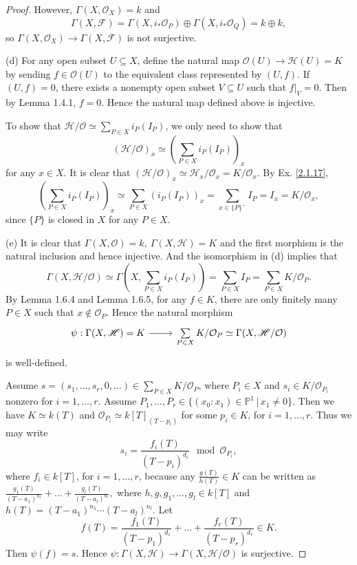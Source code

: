\documentclass{amsart}
\theoremstyle{remark}\newtheorem{rmk}[theorem]{Remark}
\begin{document}
\begin{proof}
	However, $\Gamma(X,\mathcal{O}_X)=k$ and $$\Gamma(X,\mathscr{F})=\Gamma(X,i_*\mathcal{O}_P)\oplus\Gamma(X,i_*\mathcal{O}_Q)=k\oplus k,$$ so $\Gamma(X,\mathcal{O}_X)\to\Gamma(X,\mathscr{F})$ is not surjective.
	
	(d) For any open subset $U\subseteq X$, define the natural map $\mathcal{O}(U)\to\mathscr{H}(U)=K$ by sending $f\in\mathcal{O}(U)$ to the equivalent class represented by $(U,f)$. If $(U,f)=0$, there exists a nonempty open subset $V\subseteq U$ such that $f|_V=0$. Then by Lemma 1.4.1, $f=0$. Hence the natural map defined above is injective.
	
	To show that $\mathscr{H}/\mathcal{O}\simeq\sum_{P\in X}i_P(I_P)$, we only need to show that $$(\mathscr{H}/\mathcal{O})_x\simeq\left(\sum_{P\in X}i_P(I_P)\right)_x$$ for any $x\in X$. It is clear that $(\mathscr{H}/\mathcal{O})_x\simeq\mathscr{H}_x/\mathcal{O}_x=K/\mathcal{O}_x$. By Ex. \ref{2.1.17}, $$\left(\sum_{P\in X}i_P(I_P)\right)_x\simeq\sum_{P\in X}(i_P(I_P))_x=\sum_{x\in\{P\}^-}I_P=I_x=K/\mathcal{O}_x,$$ since $\{P\}$ is closed in $X$ for any $P\in X$.
	
	(e) It is clear that $\Gamma(X,\mathcal{O})=k,\ \Gamma(X,\mathscr{H})=K$ and the first morphism is the natural inclusion and hence injective. And the isomorphism in (d) implies that $$\Gamma(X,\mathscr{H}/\mathcal{O})\simeq\Gamma\left(X,\sum_{P\in X}i_P(I_P)\right)=\sum_{P\in X}I_P=\sum_{P\in X}K/\mathcal{O}_P.$$ By Lemma 1.6.4 and Lemma 1.6.5, for any $f\in K$, there are only finitely many $P\in X$ such that $x\notin\mathcal{O}_P$. Hence the natural morphism 
	\begin{equation*}
		\begin{tikzcd}
			{\psi:\Gamma(X,\mathscr{H})=K} \arrow[r] & {\sum\limits_{P\in X}K/\mathcal{O}_P\simeq\Gamma(X,\mathscr{H}/\mathcal{O})}
		\end{tikzcd}
	\end{equation*}
	is well-defined.
	
	Assume $s=(s_1,\dots,s_r,0,\dots)\in\sum_{P\in X}K/\mathcal{O}_P$, where $P_i\in X$ and $s_i\in K/\mathcal{O}_{P_i}$ nonzero for $i=1,\dots,r$. Assume $P_1,\dots,P_r\in\{(x_0:x_1)\in\mathbb{P}^1\,|\,x_1\neq0\}$. Then we have $K\simeq k(T)$ and $\mathcal{O}_{P_i}\simeq k[T]_{(T-p_i)}$ for some $p_i\in K$, for $i=1,\dots,r$. Thus we may write $$s_i=\frac{f_i(T)}{(T-p_i)^{d_i}}\mod\mathcal{O}_{P_i},$$ where $f_i\in k[T]$, for $i=1,\dots,r$, because any $\frac{g(T)}{h(T)}\in K$ can be written as $\frac{g_1(T)}{(T-a_1)^{n_1}}+\dots+\frac{g_l(T)}{(T-a_l)^{n_l}},$ where $h,g,g_1,\dots,g_l\in k[T]$ and $h(T)=(T-a_1)^{n_1}\cdots(T-a_l)^{n_l}$. Let $$f(T)=\frac{f_1(T)}{(T-p_1)^{d_1}}+\dots+\frac{f_r(T)}{(T-p_r)^{d_r}}\in K.$$ Then $\psi(f)=s$. Hence $\psi:\Gamma(X,\mathscr{H})\to\Gamma(X,\mathscr{H}/\mathcal{O})$ is surjective.
	

\end{proof}
\end{document}
